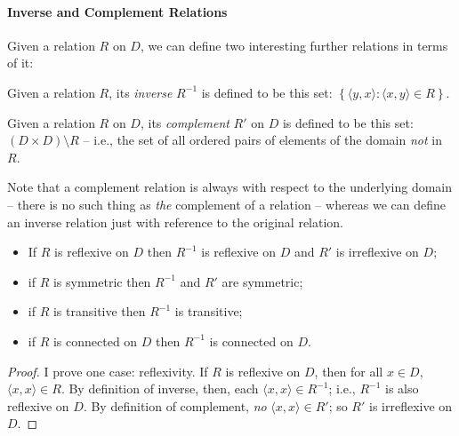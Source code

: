 \paragraph{Inverse and Complement Relations}
Given a relation $R$ on $D$, we can define two interesting further relations in terms of it: \begin{definition}[Inverse] \label{definverse}
Given a relation $R$, its \emph{inverse} $R^{-1}$ is defined to be this set: $\left\{\langle y,x\rangle:\langle x,y\rangle \in R\right\}$. \end{definition}
\begin{definition}[Complement]
Given a relation $R$ on $D$, its \emph{complement} $R'$ on $D$ is defined to be this set: $(D \times D) \setminus R$ – i.e., the set of all ordered pairs of elements of the domain \emph{not} in $R$.
 \end{definition} Note that a complement relation is always with respect to the underlying domain – there is no such thing as \emph{the} complement of a relation – whereas we can define an inverse relation just with reference to the original relation. 

\begin{theorem}
  \begin{itemize}
    \item If $R$ is reflexive on $D$ then $R^{-1}$ is reflexive on $D$ and $R'$ is irreflexive on $D$;
    \item  if $R$ is symmetric then $R^{-1}$ and $R'$ are symmetric; 
    \item if $R$ is transitive then $R^{-1}$ is transitive;
    \item  if $R$ is connected on $D$ then $R^{-1}$ is connected on $D$.
  \end{itemize}
\begin{proof}
  I prove one case: reflexivity. If $R$ is reflexive on $D$, then for all $x \in D$, $\langle x,x\rangle \in R$. By definition of inverse, then, each $\langle x,x\rangle \in R^{-1}$; i.e., $R^{-1}$ is also reflexive on $D$.  By definition of complement, \emph{no} $\langle x,x\rangle \in R'$; so $R'$ is irreflexive on $D$.
\end{proof}\end{theorem}



